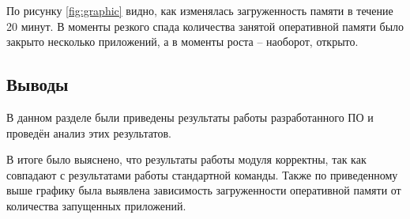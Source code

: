 По рисунку \ref{fig:graphic} видно, как изменялась загруженность памяти в течение 20 минут. В моменты резкого спада количества занятой оперативной памяти было закрыто несколько приложений, а в моменты роста -- наоборот, открыто.

\subsection*{Выводы}
В данном разделе были приведены результаты работы разработанного ПО и проведён анализ этих результатов. 

В итоге было выяснено, что результаты работы модуля корректны, так как совпадают с результатами работы стандартной команды. Также по приведенному выше графику была выявлена зависимость загруженности оперативной памяти от количества запущенных приложений.

